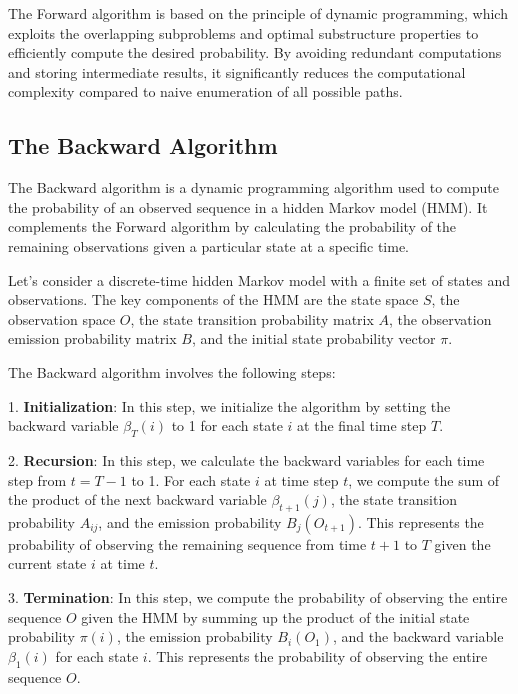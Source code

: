 \documentclass[a4paper,11pt]{article}
\begin{document}
The Forward algorithm is based on the principle of dynamic programming, which exploits the overlapping subproblems and optimal substructure properties to efficiently compute the desired probability. By avoiding redundant computations and storing intermediate results, it significantly reduces the computational complexity compared to naive enumeration of all possible paths.

\subsection{The Backward Algorithm}
\label{sec:backward}

The Backward algorithm is a dynamic programming algorithm used to compute the probability of an observed sequence in a hidden Markov model (HMM). It complements the Forward algorithm by calculating the probability of the remaining observations given a particular state at a specific time.

Let's consider a discrete-time hidden Markov model with a finite set of states and observations. The key components of the HMM are the state space $S$, the observation space $O$, the state transition probability matrix $A$, the observation emission probability matrix $B$, and the initial state probability vector $\pi$.

The Backward algorithm involves the following steps:

1. \textbf{Initialization}: In this step, we initialize the algorithm by setting the backward variable $\beta_T(i)$ to 1 for each state $i$ at the final time step $T$.

2. \textbf{Recursion}: In this step, we calculate the backward variables for each time step from $t = T-1$ to 1. For each state $i$ at time step $t$, we compute the sum of the product of the next backward variable $\beta_{t+1}(j)$, the state transition probability $A_{ij}$, and the emission probability $B_{j}(O_{t+1})$. This represents the probability of observing the remaining sequence from time $t+1$ to $T$ given the current state $i$ at time $t$.

3. \textbf{Termination}: In this step, we compute the probability of observing the entire sequence $O$ given the HMM by summing up the product of the initial state probability $\pi(i)$, the emission probability $B_{i}(O_1)$, and the backward variable $\beta_1(i)$ for each state $i$. This represents the probability of observing the entire sequence $O$.
\end{document}
